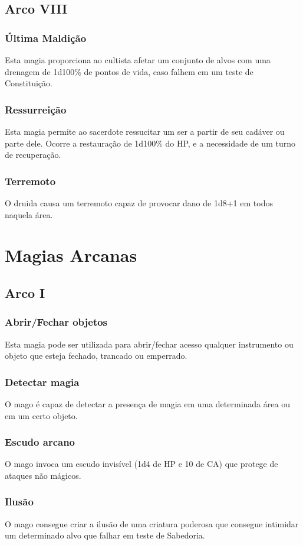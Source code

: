 \documentclass[10pt,twoside,twocolumn]{book}
\begin{document}
\subsection*{Arco VIII}
\subsubsection*{Última Maldição}
Esta magia proporciona ao cultista afetar um conjunto de alvos com uma drenagem de 1d100\% de pontos de vida, caso falhem em um teste de Constituição.
\subsubsection*{Ressurreição}
Esta magia permite ao sacerdote ressucitar um ser a partir de seu cadáver ou parte dele. Ocorre a restauração de 1d100\% do HP, e a necessidade de um turno de recuperação.
\subsubsection*{Terremoto}
O druida causa um terremoto capaz de provocar dano de 1d8+1 em todos naquela área.

\section{Magias Arcanas}

\subsection*{Arco I}
\subsubsection*{Abrir/Fechar objetos}
Esta magia pode ser utilizada para abrir/fechar acesso qualquer instrumento ou objeto que esteja fechado, trancado ou emperrado.
\subsubsection*{Detectar magia}
O mago é capaz de detectar a presença de magia em uma determinada área ou em um certo objeto.
\subsubsection*{Escudo arcano}
O mago invoca um escudo invisível (1d4 de HP e 10 de CA) que protege de ataques não mágicos.
\subsubsection*{Ilusão}
O mago consegue criar a ilusão de uma criatura poderosa que consegue intimidar um determinado alvo que falhar em teste de Sabedoria.
\end{document}
